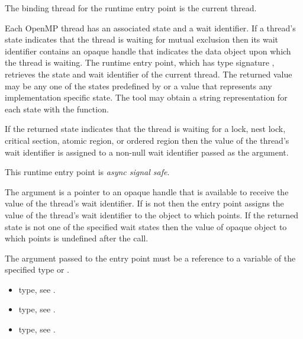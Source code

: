 \binding
The binding thread for the  runtime entry point 
is the current thread.

\descr
Each OpenMP thread has an associated state and a wait identifier. If
a thread's state indicates that the thread is waiting for mutual exclusion
then its wait identifier contains an opaque handle that indicates the 
data object upon which the thread is waiting. The  
runtime entry point, which has type signature ,
retrieves the state and wait identifier of the current thread.
The returned value may be any one of the states predefined by 
 or a value that represents any implementation
specific state. The tool may obtain a string representation for each 
state with the  function.

If the returned state indicates that the thread is waiting for a
lock, nest lock, critical section, atomic region, or ordered region
then the value of the thread's wait identifier is assigned to a
non-null wait identifier passed as the  argument.

This runtime entry point is \emph{async signal safe}.

\argdesc
The  argument is a pointer to an opaque handle that is
available to receive the value of the thread's wait identifier. If
 is not  then the entry point assigns the 
value of the thread's wait identifier to the object to which 
 points. If the returned state is not one of the specified
wait states then the value of opaque object to which  points
is undefined after the call.

\constraints
The argument passed to the entry point must be a reference
to a variable of the specified type or .

\crossreferences
\begin{itemize}
\item {} type, see .

\item {} type, see .

\item {} type, see .
\end{itemize}



\subsubsection{}
\label{sec:ompt_get_parallel_info_t}
\label{sec:ompt_get_parallel_info}

